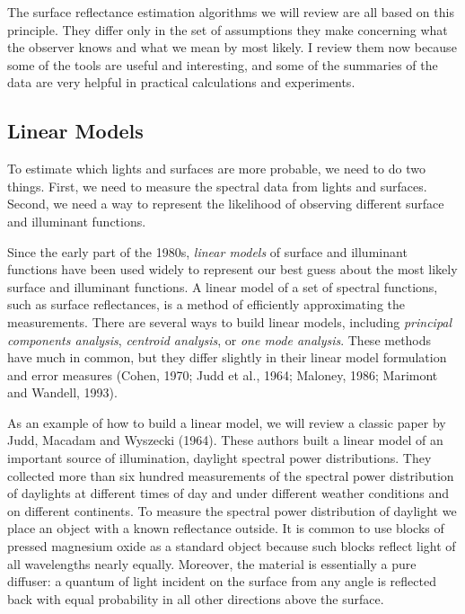 The surface reflectance estimation algorithms we will review are all
based on this principle.  They differ only in the set of assumptions
they make concerning what the observer knows and what we mean by most
likely.  I review them now because some of the tools are useful and
interesting, and some of the summaries of the data are very helpful in
practical calculations and experiments.

\subsection*{Linear Models}
To estimate which lights and surfaces are more probable, we need to do
two things.  First, we need to measure the spectral data from lights
and surfaces.  Second, we need a way to represent the likelihood of
observing different surface and illuminant functions.

Since the early part of the 1980s, {\em linear models} of surface and
illuminant functions have been used widely to represent our best guess
about the most likely surface and illuminant functions.  A linear
model of a set of spectral functions, such as surface reflectances, is
a method of efficiently approximating the measurements.  There are
several ways to build linear models, including {\em principal
components analysis}, {\em centroid analysis}, or {\em one mode
analysis}.  These methods have much in common, but they differ
slightly in their linear model formulation and error measures (Cohen,
1970; Judd et al., 1964; Maloney, 1986; Marimont and Wandell, 1993).

As an example of how to build a linear model, we will review a classic
paper by Judd, Macadam and Wyszecki (1964).  These authors built a
linear model of an important source of illumination, daylight spectral
power distributions.  They collected more than six hundred
measurements of the spectral power distribution of daylights at
different times of day and under different weather conditions and on
different continents.  To measure the spectral power distribution of
daylight we place an object with a known reflectance outside.  It is
common to use blocks of pressed magnesium oxide as a standard object
because such blocks reflect light of all wavelengths nearly equally.
Moreover, the material is essentially a pure diffuser: a quantum of
light incident on the surface from any angle is reflected back with
equal probability in all other directions above the surface.

